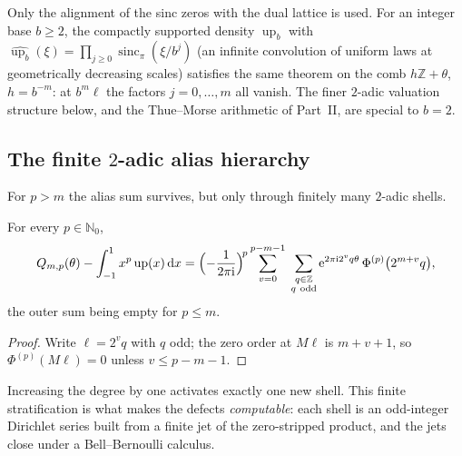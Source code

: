 \documentclass[11pt,oneside]{article}
\numberwithin{equation}{section}
\theoremstyle{definition}
\theoremstyle{remark}
\newcommand{\N}{\mathbb N}
\newcommand{\Z}{\mathbb Z}
\newcommand{\dd}{\,\mathrm d}
\newcommand{\e}{\mathrm e}
\newcommand{\ii}{\mathrm i}
\newcommand{\Up}{\operatorname{up}}
\newcommand{\sincpi}{\operatorname{sinc}_{\pi}}
\begin{document}
\begin{remark}
\label{rem:base-b}
Only the alignment of the sinc zeros with the dual lattice is used.
For an integer base $b\ge2$, the compactly supported density $\Up_b$
with $\widehat{\Up_b}(\xi)=\prod_{j\ge0}\sincpi(\xi/b^{j})$ (an
infinite convolution of uniform laws at geometrically decreasing
scales) satisfies the same theorem on the comb $h\Z+\theta$,
$h=b^{-m}$: at $b^{m}\ell$ the factors $j=0,\dots,m$ all vanish.  The
finer $2$-adic valuation structure below, and the Thue--Morse
arithmetic of Part~II, are special to $b=2$.
\end{remark}

\subsection{The finite \texorpdfstring{$2$}{2}-adic alias hierarchy}

For $p>m$ the alias sum survives, but only through finitely many
$2$-adic shells.

\begin{proposition}
\label{prop:alias-layers}
For every $p\in\N_0$,
\begin{equation}
 Q_{m,p}(\theta)-\int_{-1}^{1}x^{p}\Up(x)\dd x
 =\Bigl(-\frac{1}{2\pi\ii}\Bigr)^{\!p}
 \sum_{v=0}^{p-m-1}\;
 \sum_{\substack{q\in\Z\\ q\ \mathrm{odd}}}
 \e^{2\pi\ii2^{v}q\theta}\,
 \Phi^{(p)}\bigl(2^{m+v}q\bigr),
 \label{eq:alias-layers}
\end{equation}
the outer sum being empty for $p\le m$.
\end{proposition}

\begin{proof}
Write $\ell=2^{v}q$ with $q$ odd; the zero order at $M\ell$ is
$m+v+1$, so $\Phi^{(p)}(M\ell)=0$ unless $v\le p-m-1$.
\end{proof}

Increasing the degree by one activates exactly one new shell.  This
finite stratification is what makes the defects \emph{computable}: each
shell is an odd-integer Dirichlet series built from a finite jet of
the zero-stripped product, and the jets close under a Bell--Bernoulli
calculus.
\end{document}
